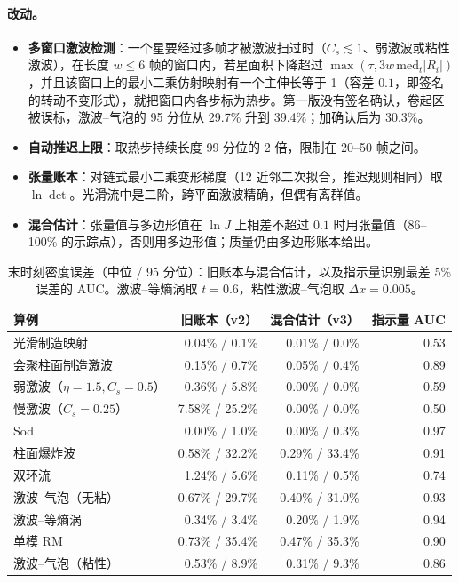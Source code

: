 \paragraph{改动。}
\begin{itemize}
\item \textbf{多窗口激波检测}：一个星要经过多帧才被激波扫过时（$C_s\lesssim1$、弱激波或粘性激波），在长度 $w\le6$ 帧的窗口内，若星面积下降超过 $\max(\tau,3w\,\mathrm{med}_t|R_i|)$，并且该窗口上的最小二乘仿射映射有一个主伸长等于 1（容差 $0.1$，即签名的转动不变形式），就把窗口内各步标为热步。第一版没有签名确认，卷起区被误标，激波–气泡的 95 分位从 29.7\% 升到 39.4\%；加确认后为 30.3\%。
\item \textbf{自动推迟上限}：取热步持续长度 99 分位的 2 倍，限制在 20–50 帧之间。
\item \textbf{张量账本}：对链式最小二乘变形梯度（12 近邻二次拟合，推迟规则相同）取 $\ln\det$。光滑流中是二阶，跨平面激波精确，但偶有离群值。
\item \textbf{混合估计}：张量值与多边形值在 $\ln J$ 上相差不超过 $0.1$ 时用张量值（86--100\% 的示踪点），否则用多边形值；质量仍由多边形账本给出。
\end{itemize}
\begin{table}[!htbp]\centering\small\caption{末时刻密度误差（中位 / 95 分位）：旧账本与混合估计，以及指示量识别最差 5\% 误差的 AUC。激波–等熵涡取 $t=0.6$，粘性激波–气泡取 $\Delta x=0.005$。}
\begin{tabularx}{\linewidth}{@{}L r r r@{}}\toprule
算例 & 旧账本（v2） & 混合估计（v3） & 指示量 AUC\\\midrule
光滑制造映射 & 0.04\% / 0.1\% & 0.01\% / 0.0\% & 0.53\\
会聚柱面制造激波 & 0.15\% / 0.7\% & 0.05\% / 0.4\% & 0.89\\
弱激波（$\eta=1.5,C_s=0.5$） & 0.36\% / 5.8\% & 0.00\% / 0.0\% & 0.59\\
慢激波（$C_s=0.25$） & 7.58\% / 25.2\% & 0.00\% / 0.0\% & 0.50\\
Sod & 0.00\% / 1.0\% & 0.00\% / 0.3\% & 0.97\\
柱面爆炸波 & 0.58\% / 32.2\% & 0.29\% / 33.4\% & 0.91\\
双环流 & 1.24\% / 5.6\% & 0.11\% / 0.5\% & 0.74\\
激波–气泡（无粘） & 0.67\% / 29.7\% & 0.40\% / 31.0\% & 0.93\\
激波–等熵涡 & 0.34\% / 3.4\% & 0.20\% / 1.9\% & 0.94\\
单模 RM & 0.73\% / 35.4\% & 0.47\% / 35.3\% & 0.90\\
激波–气泡（粘性） & 0.53\% / 8.9\% & 0.31\% / 9.3\% & 0.86\\
\bottomrule\end{tabularx}\end{table}
